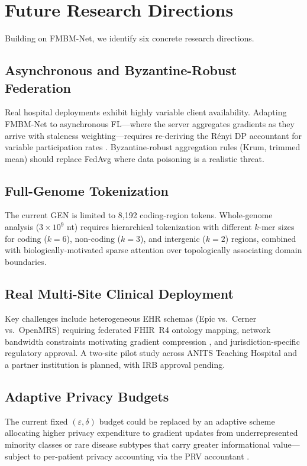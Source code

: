 \documentclass[a4paper,fleqn]{cas-dc}
\begin{document}

\section{Future Research Directions}
\label{sec:future}

Building on FMBM-Net, we identify six concrete research directions.

\subsection{Asynchronous and Byzantine-Robust Federation}
Real hospital deployments exhibit highly variable client availability. Adapting FMBM-Net to asynchronous FL---where the server aggregates gradients as they arrive with staleness weighting---requires re-deriving the R\'{e}nyi DP accountant for variable participation rates \citep{mironov2017renyi}. Byzantine-robust aggregation rules (Krum, trimmed mean) should replace FedAvg where data poisoning is a realistic threat.

\subsection{Full-Genome Tokenization}
The current GEN is limited to 8,192 coding-region tokens. Whole-genome analysis ($3\!\times\!10^9$ nt) requires hierarchical tokenization with different $k$-mer sizes for coding ($k\!=\!6$), non-coding ($k\!=\!3$), and intergenic ($k\!=\!2$) regions, combined with biologically-motivated sparse attention over topologically associating domain boundaries.

\subsection{Real Multi-Site Clinical Deployment}
Key challenges include heterogeneous EHR schemas (Epic vs.\ Cerner vs.\ OpenMRS) requiring federated FHIR~R4 ontology mapping, network bandwidth constraints motivating gradient compression \citep{karimireddy2020scaffold}, and jurisdiction-specific regulatory approval. A two-site pilot study across ANITS Teaching Hospital and a partner institution is planned, with IRB approval pending.

\subsection{Adaptive Privacy Budgets}
The current fixed $(\varepsilon,\delta)$ budget could be replaced by an adaptive scheme allocating higher privacy expenditure to gradient updates from underrepresented minority classes or rare disease subtypes that carry greater informational value---subject to per-patient privacy accounting via the PRV accountant \citep{gopi2021prv}.
\end{document}

